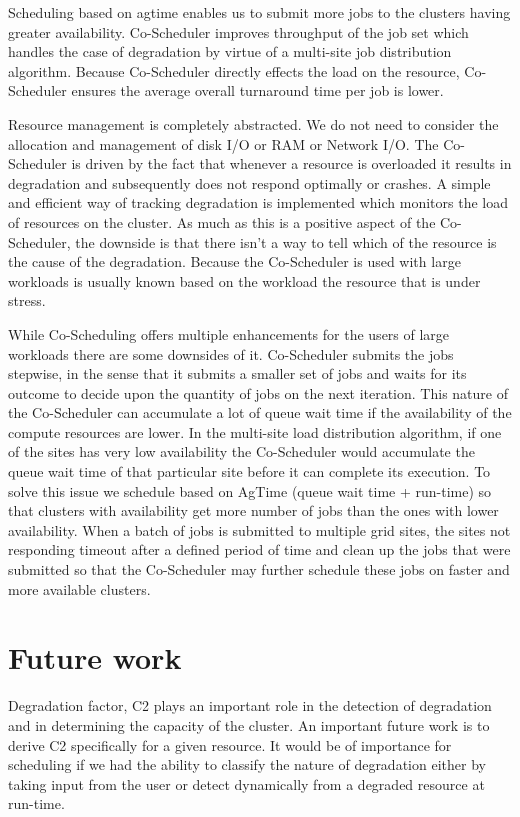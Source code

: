 \documentclass[ms,electronic,double]{nuthesis}
\begin{document}
Scheduling based on agtime enables us to submit more jobs to the clusters having greater availability. Co-Scheduler improves throughput of the job set which handles the 
case of degradation by virtue of a multi-site job distribution algorithm. Because Co-Scheduler directly effects the load on the resource, Co-Scheduler 
ensures the average overall turnaround time per job is lower.

Resource management is completely abstracted. We do not need to consider the 
allocation and management of disk I/O or RAM or Network I/O. The Co-Scheduler is 
driven by the fact that whenever a resource is overloaded it results in 
degradation and subsequently does not respond optimally or crashes. A simple and 
efficient way of tracking degradation is implemented which monitors the load of 
resources on the cluster. As much as this is a positive aspect of the 
Co-Scheduler, the downside is that there isn't a way to tell which of the resource is 
the cause of the degradation. Because the Co-Scheduler is used with large workloads is usually known based on 
the workload the resource that is under stress.

While Co-Scheduling offers multiple enhancements for the users of large workloads 
there are some downsides of it. Co-Scheduler submits the jobs stepwise, in 
the sense that it submits a smaller set of jobs and waits for its outcome to decide upon the quantity 
of jobs on the next iteration. This 
nature of the Co-Scheduler can accumulate a lot of queue wait time if the availability 
of the compute resources are lower. In the multi-site load distribution 
algorithm, if one of the sites has very low availability the Co-Scheduler would 
accumulate the queue wait time of that particular site before it can complete 
its execution. To solve this issue we schedule based on AgTime (queue wait time + run-time) so that clusters with availability 
get more number of jobs than the ones with lower availability. When a batch of 
jobs is submitted to multiple grid sites, the sites not responding timeout after 
a defined period of time and clean up the jobs that were submitted so that the Co-Scheduler may further 
schedule these jobs on faster and more available clusters. 

\section{Future work}

Degradation factor, C2 plays an important role in the detection of degradation and in determining the capacity of the cluster. An important future
work is to derive C2 specifically for a given resource. It would be of importance for scheduling if we had the ability to classify the nature of degradation either by taking input from the user or detect dynamically from a degraded resource at run-time.
\end{document}

